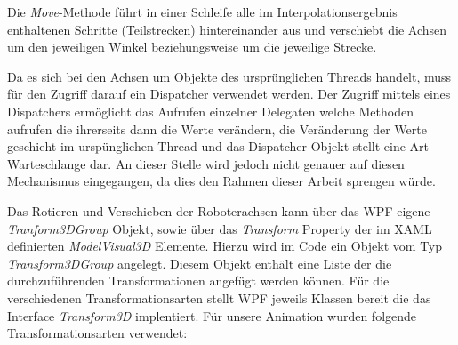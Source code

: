 Die \textit{Move}-Methode führt in einer Schleife alle im Interpolationsergebnis enthaltenen Schritte (Teilstrecken) hintereinander aus und verschiebt die Achsen um den jeweiligen Winkel beziehungsweise um die jeweilige Strecke. 

Da es sich bei den Achsen um Objekte des ursprünglichen Threads handelt, muss für den Zugriff darauf ein Dispatcher verwendet werden. Der Zugriff mittels eines Dispatchers ermöglicht das Aufrufen einzelner Delegaten welche Methoden aufrufen die ihrerseits dann die Werte verändern, die Veränderung der Werte geschieht im urspünglichen Thread und das Dispatcher Objekt stellt eine Art Warteschlange dar. An dieser Stelle wird jedoch nicht genauer auf diesen Mechanismus eingegangen, da dies den Rahmen dieser Arbeit sprengen würde.

Das Rotieren und Verschieben der Roboterachsen kann über das WPF eigene \textit{Tranform3DGroup} Objekt, sowie über das \textit{Transform} Property der im XAML definierten \textit{ModelVisual3D} Elemente.
Hierzu wird im Code ein Objekt vom Typ \textit{ Transform3DGroup} angelegt. Diesem Objekt enthält eine Liste der die durchzuführenden Transformationen angefügt werden können. Für die verschiedenen Transformationsarten stellt WPF jeweils Klassen bereit die das Interface \textit{Transform3D} implentiert. Für unsere Animation wurden folgende Transformationsarten verwendet:

